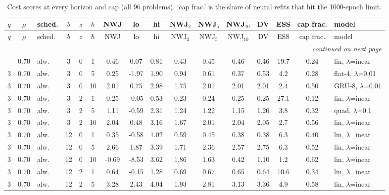 \begin{scriptsize}
\setlength{\tabcolsep}{3pt}
\begin{longtable}{cclcc c ccc ccc c cc l}
\caption{Cost scores at every horizon and cap (all 96 problems). `cap frac.' is the share of neural refits that hit the 1000-epoch limit.}\label{tab:app-cost}\\
\toprule
$q$ & $\rho$ & sched. & $b$ & $z$ & $h$ & NWJ & lo & hi & NWJ$_2$ & NWJ$_5$ & NWJ$_{10}$ & DV & ESS & cap frac. & model \\
\midrule
\endfirsthead
\toprule
$q$ & $\rho$ & sched. & $b$ & $z$ & $h$ & NWJ & lo & hi & NWJ$_2$ & NWJ$_5$ & NWJ$_{10}$ & DV & ESS & cap frac. & model \\
\midrule
\endhead
\midrule
\multicolumn{16}{r}{\emph{continued on next page}}\\
\endfoot
\bottomrule
\endlastfoot
3 & 0.70 & alw. & 3 & 0 & 1 & 0.46 & 0.07 & 0.81 & 0.43 & 0.45 & 0.46 & 0.46 & 19.7 & 0.24 & lin, $\lambda$=inear \\
3 & 0.70 & alw. & 3 & 0 & 5 & 0.25 & -1.97 & 1.90 & 0.94 & 0.61 & 0.37 & 0.53 & 4.2 & 0.28 & flat-4, $\lambda$=0.01 \\
3 & 0.70 & alw. & 3 & 0 & 10 & 2.01 & 0.75 & 2.98 & 1.75 & 2.01 & 2.01 & 2.01 & 2.4 & 0.50 & GRU-8, $\lambda$=0.01 \\
3 & 0.70 & alw. & 3 & 2 & 1 & 0.25 & -0.05 & 0.53 & 0.23 & 0.24 & 0.25 & 0.25 & 27.1 & 0.12 & lin, $\lambda$=inear \\
3 & 0.70 & alw. & 3 & 2 & 5 & 1.11 & -0.59 & 2.31 & 1.24 & 1.22 & 1.15 & 1.20 & 3.8 & 0.32 & quad, $\lambda$=0.1 \\
3 & 0.70 & alw. & 3 & 2 & 10 & 2.04 & 0.48 & 3.16 & 1.67 & 2.01 & 2.04 & 2.05 & 2.7 & 0.56 & lin, $\lambda$=inear \\
3 & 0.70 & alw. & 12 & 0 & 1 & 0.35 & -0.58 & 1.02 & 0.59 & 0.45 & 0.38 & 0.38 & 6.3 & 0.40 & lin, $\lambda$=inear \\
3 & 0.70 & alw. & 12 & 0 & 5 & 2.66 & 1.87 & 3.39 & 1.71 & 2.36 & 2.57 & 2.75 & 6.3 & 0.52 & lin, $\lambda$=inear \\
3 & 0.70 & alw. & 12 & 0 & 10 & -0.69 & -8.53 & 3.62 & 1.86 & 1.63 & 0.42 & 1.10 & 1.2 & 0.62 & lin, $\lambda$=inear \\
3 & 0.70 & alw. & 12 & 2 & 1 & 0.64 & -0.15 & 1.28 & 0.69 & 0.67 & 0.65 & 0.64 & 10.6 & 0.34 & lin, $\lambda$=inear \\
3 & 0.70 & alw. & 12 & 2 & 5 & 3.28 & 2.43 & 4.04 & 1.93 & 2.81 & 3.13 & 3.36 & 4.9 & 0.58 & lin, $\lambda$=inear \\

\end{longtable}
\end{scriptsize}
